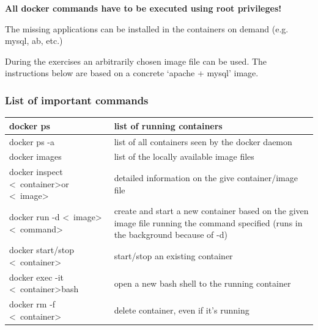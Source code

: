 \documentclass[a4paper]{article}
\begin{document}
\textbf{All docker commands have to be executed using root privileges!}

The missing applications can be installed in the containers on demand (e.g. mysql, ab, etc.)

During the exercises an arbitrarily chosen image file can be used. The instructions below are based on a concrete
`apache + mysql' image.

\subsubsection{List of important commands}
\begin{table}[h]
    \begin{tabularx}{\textwidth}{|l|X|}
        \hline docker ps                                                                     & list of running containers                       \\
        \hline docker ps -a                                                                  & list of all containers seen by the docker daemon \\
        \hline docker images                                                                 & list of the locally available image files        \\
        \hline docker inspect \textless~container\textgreater or \textless~image\textgreater & detailed information on the
        give container/image file                                                                                                               \\
        \hline docker run -d \textless~image\textgreater \textless~command\textgreater       & create and start a new container
        based on the given image file running the command specified (runs in the background because of -d)                                      \\
        \hline docker start/stop \textless~container\textgreater                             & start/stop an existing container                 \\
        \hline docker exec -it \textless~container\textgreater bash                          & open a new bash shell to the running container   \\
        \hline docker rm -f \textless~container\textgreater                                  & delete container, even if it's running           \\
        \hline
    \end{tabularx}
\end{table}
\end{document}
